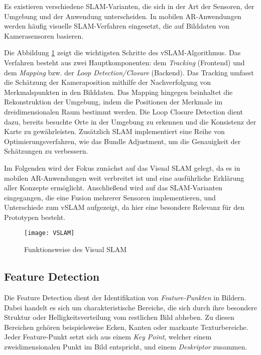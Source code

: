 Es existieren verschiedene SLAM-Varianten, die sich in der Art der Sensoren, der Umgebung und der Anwendung unterscheiden. In mobilen AR-Anwendungen werden häufig visuelle SLAM-Verfahren eingesetzt, die auf Bilddaten von Kamerasensoren basieren. \cite{tourani2022vSLAMTrends}

Die Abbildung \ref{fig:VSLAM} zeigt die wichtigsten Schritte des vSLAM-Algorithmus. Das Verfahren besteht aus zwei Hauptkomponenten: dem \emph{Tracking} (Frontend) und dem \emph{Mapping} bzw. der \emph{Loop Detection/Closure} (Backend). Das Tracking umfasst die Schätzung der Kameraposition mithilfe der Nachverfolgung von Merkmalspunkten in den Bilddaten. Das Mapping hingegen beinhaltet die Rekonstruktion der Umgebung, indem die Positionen der Merkmale im dreidimensionalen Raum bestimmt werden. Die Loop Closure Detection dient dazu, bereits besuchte Orte in der Umgebung zu erkennen und die Konsistenz der Karte zu gewährleisten. Zusätzlich SLAM implementiert eine Reihe von Optimierungsverfahren, wie das Bundle Adjustment, um die Genauigkeit der Schätzungen zu verbessern. \cite{gao2021vSLAM, tourani2022vSLAMTrends}

Im Folgenden wird der Fokus zunächst auf das Visual SLAM gelegt, da es in mobilen AR-Anwendungen weit verbreitet ist und eine ausführliche Erklärung aller Konzepte ermöglicht. Anschließend wird auf das SLAM-Varianten eingegangen, die eine Fusion mehrerer Sensoren implementieren, und Unterschiede zum vSLAM aufgezeigt, da hier eine besondere Relevanz für den Prototypen besteht. \cite{gao2021vSLAM, tourani2022vSLAMTrends, doerner2022virtual}

\begin{figure}
    \centering
    \texttt{[image: VSLAM]}
    \caption{Funktionsweise des Visual SLAM \cite{tourani2022vSLAMTrends}\label{fig:VSLAM}}\par
\end{figure}

\subsection{Feature Detection}

Die Feature Detection dient der Identifikation von \emph{Feature-Punkten} in Bildern. Dabei handelt es sich um charakteristische Bereiche, die sich durch ihre besondere Struktur oder Helligkeitsverteilung vom restlichen Bild abheben. Zu diesen Bereichen gehören beispielsweise Ecken, Kanten oder markante Texturbereiche. Jeder Feature-Punkt setzt sich aus einem \emph{Key Point}, welcher einem zweidimensionalen Punkt im Bild entspricht, und einem \emph{Deskriptor} zusammen. \cite{gao2021vSLAM, szeliski2022computerVision}

